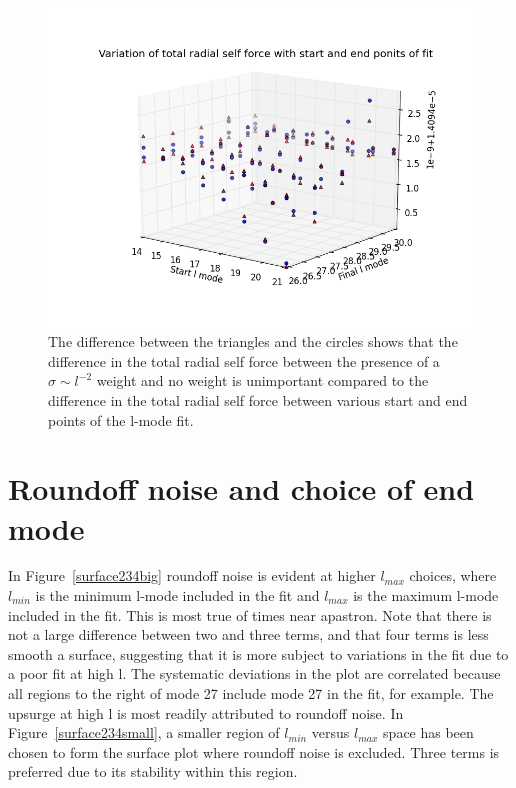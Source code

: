 \begin{figure}
\begin{centering}
  \includegraphics{3Dscatterwithwithoutsigmalminlmax}
  \caption{The difference between the triangles and the circles shows that the difference in the total radial self force between the presence of a $\sigma\sim l^{-2}$ weight and no weight is unimportant compared to the difference in the total radial self force between various start and end points of the l-mode fit.}
  \end{centering}
  \label{scatterfig}
\end{figure}

\section{Roundoff noise and choice of end mode}

In Figure~\ref{surface234big} roundoff noise is evident at higher $l_{max}$ choices, where $l_{min}$ is the minimum l-mode included in the fit and $l_{max}$ is the maximum l-mode included in the fit. This is most true of times near apastron. Note that there is not a large difference between two and three terms, and that four terms is less smooth a surface, suggesting that it is more subject to variations in the fit due to a poor fit at high l. The systematic deviations in the plot are correlated because all regions to the right of mode 27 include mode 27 in the fit, for example. The upsurge at high l is most readily attributed to roundoff noise. In Figure~\ref{surface234small}, a smaller region of $l_{min}$ versus $l_{max}$ space has been chosen to form the surface plot where roundoff noise is excluded. Three terms is preferred due to its stability within this region.

